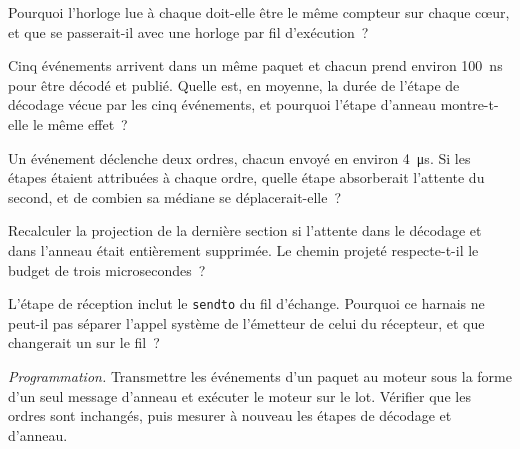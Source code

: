 \begin{exercise}[$\star$]\label{exo:ll:build-tick-to-trade-measured:2}
Pourquoi l'horloge lue à chaque  doit-elle être le même compteur sur chaque cœur, et que se passerait-il avec
une horloge par fil d'exécution~?
\end{exercise}

\begin{exercise}[$\star$]\label{exo:ll:build-tick-to-trade-measured:3}
Cinq événements arrivent dans un même paquet et chacun prend environ \qty{100}{\nano\second} pour être décodé et publié. Quelle est, en moyenne, la durée de
l'étape de décodage vécue par les cinq événements, et pourquoi l'étape d'anneau montre-t-elle le même effet~?
\end{exercise}

\begin{exercise}[$\star\star$]\label{exo:ll:build-tick-to-trade-measured:4}
Un événement déclenche deux ordres, chacun envoyé en environ \qty{4}{\micro\second}. Si les étapes étaient attribuées à chaque ordre, quelle étape
absorberait l'attente du second, et de combien sa médiane se déplacerait-elle~?
\end{exercise}

\begin{exercise}[$\star\star$]\label{exo:ll:build-tick-to-trade-measured:5}
Recalculer la projection de la dernière section si l'attente dans le décodage et dans l'anneau était entièrement supprimée. Le chemin projeté
respecte-t-il le budget de trois microsecondes~?
\end{exercise}

\begin{exercise}[$\star\star$]\label{exo:ll:build-tick-to-trade-measured:6}
L'étape de réception inclut le \texttt{sendto} du fil d'échange. Pourquoi ce harnais ne peut-il pas séparer l'appel système de l'émetteur de celui du récepteur, et que changerait
un  sur le fil~?
\end{exercise}

\begin{exercise}[$\star\star\star$]\label{exo:ll:build-tick-to-trade-measured:7}
\emph{Programmation.} Transmettre les événements d'un paquet au moteur sous la forme d'un seul message d'anneau et exécuter le moteur sur le lot. Vérifier que les ordres sont inchangés, puis
mesurer à nouveau les étapes de décodage et d'anneau.
\end{exercise}


